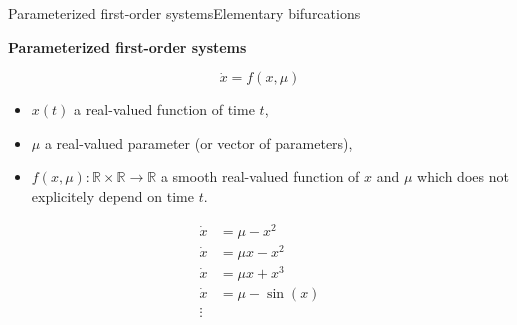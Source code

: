 \documentclass[usenames,dvipsnames,svgnames,10pt,aspectratio=169]{beamer}
\begin{document}
\begin{frame}[t, c]{Parameterized first-order systems}{Elementary bifurcations}
  \begin{minipage}{.48\textwidth}
    \begin{block}{\centering \textbf{Parameterized first-order systems}}

    \[ \dot{x} = f(x, \mu) \]
    \end{block}

    \medskip

    \begin{itemize}
    \item $x(t)$ a real-valued function of time $t$,

      \medskip

    \item $\mu$ a real-valued parameter (or vector of parameters),

      \medskip

    \item $f(x, \mu) : \mathbb{R} \times \mathbb{R} \to \mathbb{R}$ a smooth real-valued function of $x$ and $\mu$ which does not explicitely depend on time $t$.
    \end{itemize}
  \end{minipage}%
  \hfill
  \begin{minipage}{.48\textwidth}
    \[
    \begin{aligned}
      \dot{x} & = \mu - x^2 \\
      \dot{x} & = \mu x - x^2 \\
      \dot{x} & = \mu x + x^3 \\
      \dot{x} & = \mu - \sin(x) \\
      \vdots
    \end{aligned}
    \]
  \end{minipage}

  \vspace{1cm}
\end{frame}
\end{document}
